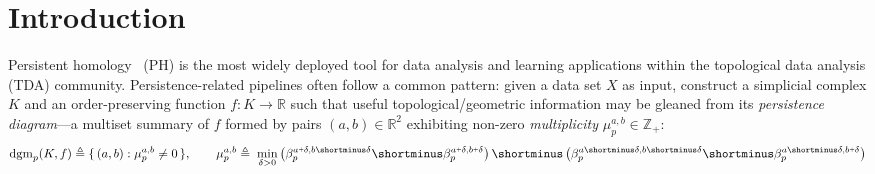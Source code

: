 \documentclass[10pt]{article}
\numberwithin{equation}{section}
\newcommand{\+}{%
	\raisebox{0.18ex}{\scaleobj{0.55}{+}}
}
\theoremstyle{definition}
\theoremstyle{definition}
\begin{document}
\section{Introduction}\label{sec:intro}
Persistent homology~\cite{edelsbrunner2000topological} (PH) is the most widely deployed tool for data analysis and learning applications within the topological data analysis (TDA) community. 
Persistence-related pipelines often follow a common pattern: given a data set $X$ as input, construct a simplicial complex $K$ and an order-preserving function $f: K \to \mathbb{R}$ such that useful topological/geometric information may be gleaned from its \emph{persistence diagram}---a 
multiset summary of $f$ formed by pairs $(a,b) \in \mathbb{R}^2$ exhibiting non-zero \emph{multiplicity} $\mu_p^{a,b} \in \mathbb{Z}_+$:
\begin{equation}\label{eq:dgm}
\mathrm{dgm}_p(K, f) \triangleq \{ \, (a, b) :  \mu_p^{a,b} \neq 0  \, \},  
\quad \quad  \mu_p^{a, b} \triangleq \; \min_{\delta > 0} \left(\beta_p^{a \+ \delta, b  \shortminus \delta} \shortminus \beta_p^{a \+ \delta, b  \+ \delta} \right) \shortminus \left(\beta_p^{a\shortminus \delta, b \shortminus \delta} \shortminus \beta_p^{a \shortminus \delta, b \+ \delta} \right)
\end{equation}
\end{document}
